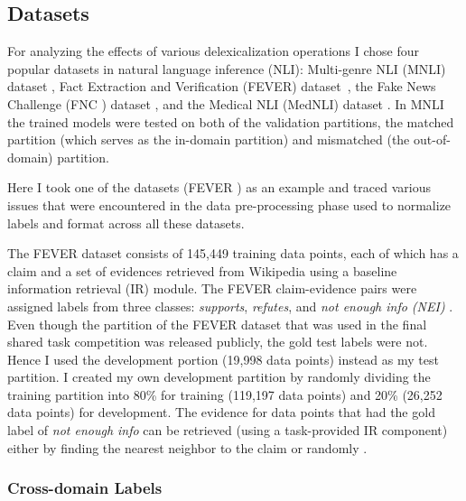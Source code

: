 \documentclass{article}
\begin{document}
\subsection{Datasets}
For analyzing the effects of various delexicalization operations I chose four  popular datasets in natural language inference (NLI): Multi-genre NLI (MNLI) dataset \cite{williams2017broad}, Fact Extraction and Verification  (FEVER) dataset~\cite{thorne2018fever}, the Fake News Challenge (FNC ) dataset \cite{pomerleau2017fake}, and the Medical NLI (MedNLI) dataset \cite{romanov2018lessons}. In MNLI the trained models were tested on both of the validation partitions, the matched partition (which serves as the in-domain partition) and mismatched (the out-of-domain) partition.

Here I took one of the datasets (FEVER \citep*{thorne2018fever}) as an example and traced various issues that were encountered in the data pre-processing phase used to normalize labels and format across all these datasets.


{} The FEVER \citep*{thorne2018fever} dataset consists of 145,449 training data points, each of which has a claim and a set of evidences retrieved from Wikipedia using a baseline information retrieval (IR) module.
The FEVER claim-evidence pairs were assigned labels from three classes: \textit{supports}, \textit{refutes}, and \textit{not enough info (NEI)} . Even though the partition of the FEVER dataset that was used in the final shared task competition was released publicly, the gold test labels were not. Hence I used the development portion (19,998 data points) instead as my test partition. I created my own development partition by randomly dividing the training partition into 80\% for training (119,197 data points) and 20\% (26,252 data points) for development.  The evidence for data points that had the gold label of \textit{not enough info} can be retrieved (using a task-provided IR component) either by finding the nearest neighbor to the claim or randomly \citep*{thorne2018fever}. 


\subsubsection{Cross-domain Labels}
\label{sec:crossdomain}
\end{document}
